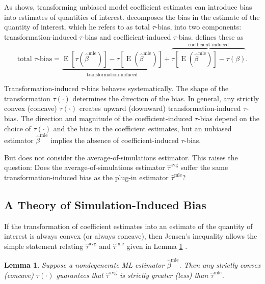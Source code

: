 \documentclass[12pt]{article}
\newtheorem{lemma}{Lemma}
\DeclareMathOperator*{\E}{\text{E}}
\begin{document}
As \citet{Rainey2017} shows, transforming unbiased model coefficient estimates can introduce bias into estimates of quantities of interest. 
\citet[p.\@ 404]{Rainey2017} decomposes the bias in the estimate of the quantity of interest, which he refers to as {total $\tau$-bias,} into two components: transformation-induced $\tau$-bias and coefficient-induced $\tau$-bias. \citet{Rainey2017} defines these as
\begin{equation}
\text{total } \tau\text{-bias}= \underbrace{ \E\left[\tau\left(\hat{\beta}^\text{mle}\right)\right]-  \tau\left[\E\left(\hat{\beta}^\text{mle}\right)\right]  }_{\text{transformation-induced}} + \overbrace{  \tau\left[\E\left(\hat{\beta}^\text{mle}\right)\right] - \tau\left(\beta\right)  }^{\text{coefficient-induced}}\text{.} \label{eqn:ti-bias}
\end{equation}

Transformation-induced $\tau$-bias behaves systematically. 
The shape of the transformation $\tau(\cdot)$ determines the direction of the bias. 
In general, any strictly convex (concave) $\tau(\cdot)$ creates upward (downward) transformation-induced $\tau$-bias.
The direction and magnitude of the coefficient-induced $\tau$-bias depend on the choice of $\tau(\cdot)$ and the bias in the coefficient estimates, but an unbiased estimator $\hat{\beta}^\text{mle}$ implies the absence of coefficient-induced $\tau$-bias. 

But \cite{Rainey2017} does not consider the average-of-simulations estimator. 
This raises the question: Does the average-of-simulations estimator $\hat{\tau}^{\text{avg}}$ suffer the same transformation-induced bias as the plug-in estimator $\hat{\tau}^\text{mle}$?

\subsection*{A Theory of Simulation-Induced Bias}

If the transformation of coefficient estimates into an estimate of the quantity of interest is always convex (or always concave), then Jensen's inequality allows the simple statement relating $\hat{\tau}^\text{avg}$ and $\hat{\tau}^{\text{mle}}$ given in Lemma \ref{lem:direction} .

\begin{lemma}\label{lem:direction}
Suppose a nondegenerate ML estimator $\hat{\beta}^\text{mle}$.
Then any strictly convex (concave) $\tau(\cdot)$ guarantees that $\hat{\tau}^{\text{avg}}$ is strictly greater (less) than $\hat{\tau}^\text{mle}$.
\end{lemma}
\end{document}
